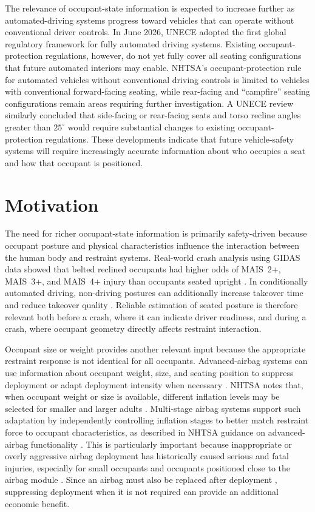 The relevance of occupant-state information is expected to increase further as automated-driving systems progress toward 
vehicles that can operate without conventional driver controls. In June 2026, UNECE adopted the first global regulatory 
framework for fully automated driving systems. Existing occupant-protection regulations, however, 
do not yet fully cover all seating configurations that future automated interiors may enable. NHTSA's occupant-protection 
rule for automated vehicles without conventional driving controls is limited to vehicles with conventional forward-facing 
seating, while rear-facing and ``campfire'' seating configurations remain areas requiring further investigation. A UNECE 
review similarly concluded that side-facing or rear-facing seats and torso recline angles greater than $25^{\circ}$ would 
require substantial changes to existing occupant-protection regulations. These developments indicate that future 
vehicle-safety systems will require increasingly accurate information about who occupies a seat and how that occupant is 
positioned.

\section{Motivation}
\label{sec}
The need for richer occupant-state information is primarily safety-driven because occupant posture and physical characteristics 
influence the interaction between the human body and restraint systems. Real-world crash analysis using GIDAS data showed that 
belted reclined occupants had higher odds of MAIS~2+, MAIS~3+, and MAIS~4+ injury than occupants seated upright 
\cite{schaefer2021reclined}. In conditionally automated driving, non-driving postures can additionally increase takeover 
time and reduce takeover quality \cite{zhao2024takeover}. Reliable estimation of seated posture is therefore relevant both 
before a crash, where it can indicate driver readiness, and during a crash, where occupant geometry directly affects restraint 
interaction.

Occupant size or weight provides another relevant input because the appropriate restraint response is not identical for all 
occupants. Advanced-airbag systems can use information about occupant weight, size, and seating position to suppress deployment 
or adapt deployment intensity when necessary \cite{nhtsaAdvancedAirbag}. NHTSA notes that, when occupant weight or size is available, 
different inflation levels may be selected for smaller and larger adults \cite{nhtsaAdvancedAirbag}. Multi-stage airbag systems 
support such adaptation by independently controlling inflation stages to better match restraint force to occupant characteristics, 
as described in NHTSA guidance on advanced-airbag functionality \cite{nhtsaAdvancedAirbag}. This is particularly important because inappropriate or overly aggressive airbag deployment has 
historically caused serious and fatal injuries, especially for small occupants and occupants positioned close to the airbag module 
\cite{nhtsaAirbags,nhtsaAirbagFatalities}. Since an airbag must also be replaced after deployment \cite{nhtsaAirbags}, suppressing 
deployment when it is not required can provide an additional economic benefit.

